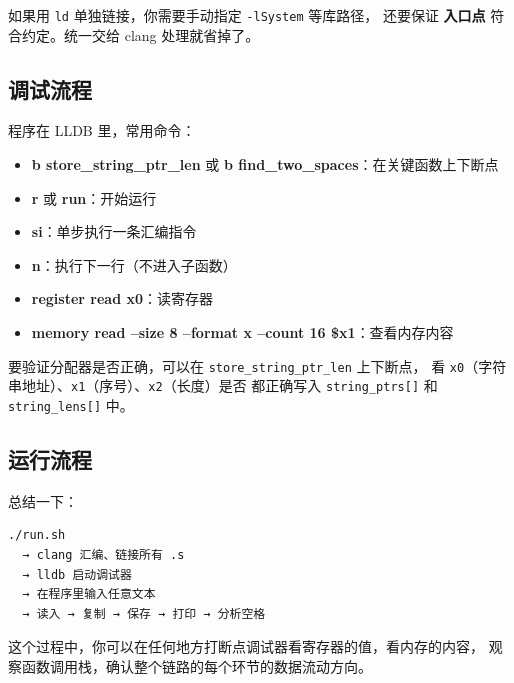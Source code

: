 如果用 \texttt{ld} 单独链接，你需要手动指定 \texttt{-lSystem} 等库路径，
还要保证 \textbf{入口点} 符合约定。统一交给 clang 处理就省掉了。

\subsection{调试流程}

程序在 LLDB 里，常用命令：

\begin{itemize}
    \item \textbf{b store\_string\_ptr\_len} 或 \textbf{b find\_two\_spaces}：在关键函数上下断点
    \item \textbf{r} 或 \textbf{run}：开始运行
    \item \textbf{si}：单步执行一条汇编指令
    \item \textbf{n}：执行下一行（不进入子函数）
    \item \textbf{register read x0}：读寄存器
    \item \textbf{memory read --size 8 --format x --count 16 \$x1}：查看内存内容
\end{itemize}

要验证分配器是否正确，可以在 \texttt{store\_string\_ptr\_len} 上下断点，
看 \texttt{x0}（字符串地址）、\texttt{x1}（序号）、\texttt{x2}（长度）是否
都正确写入 \texttt{string\_ptrs[]} 和 \texttt{string\_lens[]} 中。

\subsection{运行流程}

总结一下：

\begin{verbatim}
./run.sh
  → clang 汇编、链接所有 .s
  → lldb 启动调试器
  → 在程序里输入任意文本
  → 读入 → 复制 → 保存 → 打印 → 分析空格
\end{verbatim}

这个过程中，你可以在任何地方打断点调试器看寄存器的值，看内存的内容，
观察函数调用栈，确认整个链路的每个环节的数据流动方向。
